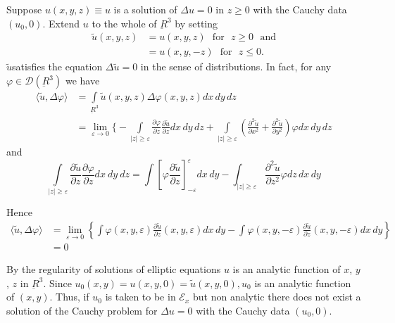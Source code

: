 Suppose $u(x, y, z) \equiv u$ is a solution of $\Delta u = 0$ in $z
\geq 0$ with the Cauchy data $(u_0,  0)$. Extend $u$ to the whole of
$\underbar{R}^3$ by setting 
\begin{align*}
\tilde{u} (x,  y,  z) & = u(x,  y,  z) \text{~ for~ } z \geq 0 \text{~
  and}\\ 
&= u(x,  y,  -z) \text{~ for~ } z \leq 0.
\end{align*}
$\tilde{u}$\pageoriginale satisfies the equation $\Delta \tilde{u} =
0$ in the sense 
of distributions. In fact, for any $\varphi \in
\mathscr{D}(\underbar{R}^3)$ we have 
\begin{align*}
\langle \tilde{u}, \Delta \varphi \rangle &=\int\limits_{\underbar{R}^3}
\tilde{u}(x,  y,  z) \Delta \varphi (x,  y,  z) dx \, dy \, dz\\ 
&= \lim\limits_{\varepsilon \to 0} \bigg\{-\int\limits_{|z|\geq \varepsilon}
\frac{\partial \varphi}{\partial z}\frac{ \partial \tilde{u}}{\partial
  z} dx \, dy \, dz + \int\limits_{|z|\geq \varepsilon}\left(\frac{ \partial^2
  \tilde{u}}{\partial x^2}+ \frac{\partial^2 \tilde{u}}{\partial y
  ^2}\right) \varphi dx \, dy \, dz  
\end{align*}
and
$$
\int\limits_{|z|\geq \varepsilon}\frac{\partial \tilde{u}}{\partial z} 
\frac{\partial \varphi}{ \partial z} dx~dy~dz = \int \left[\varphi
  \frac{\partial \tilde{u}}{\partial z}\right]^\varepsilon_{-\varepsilon}
dx \, dy- \int_{|z|\geq \varepsilon} \frac{ \partial^2 \tilde{u}}{\partial
  z^2} \varphi dz \, dx \, dy 
$$

Hence
{\fontsize{10pt}{12pt}\selectfont
\begin{align*}
\langle \tilde{u},  \Delta \varphi \rangle  &= \lim \limits_
        {\varepsilon \to 0} \left\{ \int \varphi(x,  y,  \varepsilon)
        \frac{\partial \tilde{u}} {\partial z}(x,  y,  \varepsilon)
        dx \, dy -\int \varphi (x,  y,  -\varepsilon) \frac{\partial
          \tilde{u}}{ \partial z} (x,  y,  -\varepsilon) dx \, dy \right
        \}\\ 
& = 0
\end{align*}}\relax

By the regularity of solutions of elliptic equations $u$ is an
analytic function of $x$, $y$, $z$ in $\underbar{R}^3$. Since $u_0 (x,
y) = u(x,  y,  0)= \tilde{u}(x,  y,  0),  u_0$ is an analytic function
of $(x,  y)$. Thus,  if $u_0$ is  taken to be in $\mathscr{E}_x$ but
non analytic there does not exist  a solution of the Cauchy problem
for $\Delta u = 0$ with the Cauchy data $(u_0,  0)$. 

